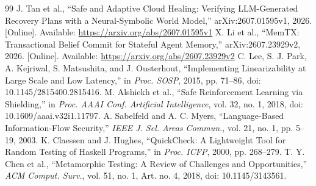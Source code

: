 \begin{thebibliography}{99}
 J. Tan et al., ``Safe and Adaptive Cloud Healing: Verifying LLM-Generated Recovery Plans with a Neural-Symbolic World Model,'' arXiv:2607.01595v1, 2026. [Online]. Available: \url{https://arxiv.org/abs/2607.01595v1}
 X. Li et al., ``MemTX: Transactional Belief Commit for Stateful Agent Memory,'' arXiv:2607.23929v2, 2026. [Online]. Available: \url{https://arxiv.org/abs/2607.23929v2}
 C. Lee, S. J. Park, A. Kejriwal, S. Matsushita, and J. Ousterhout, ``Implementing Linearizability at Large Scale and Low Latency,'' in \emph{Proc. SOSP}, 2015, pp. 71--86, doi: 10.1145/2815400.2815416.
 M. Alshiekh et al., ``Safe Reinforcement Learning via Shielding,'' in \emph{Proc. AAAI Conf. Artificial Intelligence}, vol. 32, no. 1, 2018, doi: 10.1609/aaai.v32i1.11797.
 A. Sabelfeld and A. C. Myers, ``Language-Based Information-Flow Security,'' \emph{IEEE J. Sel. Areas Commun.}, vol. 21, no. 1, pp. 5--19, 2003.
 K. Claessen and J. Hughes, ``QuickCheck: A Lightweight Tool for Random Testing of Haskell Programs,'' in \emph{Proc. ICFP}, 2000, pp. 268--279.
 T. Y. Chen et al., ``Metamorphic Testing: A Review of Challenges and Opportunities,'' \emph{ACM Comput. Surv.}, vol. 51, no. 1, Art. no. 4, 2018, doi: 10.1145/3143561.
\end{thebibliography}
